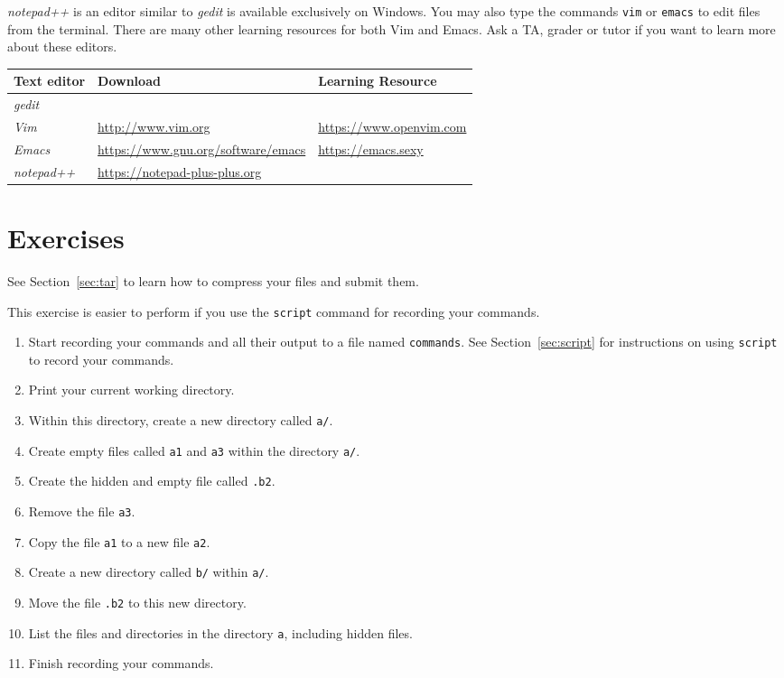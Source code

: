 \documentclass[11pt]{cselabheader}
\begin{document}
\textit{notepad++} is an editor similar to \textit{gedit} is available
exclusively on Windows.  You may also type the commands \texttt{vim} or
\texttt{emacs} to edit files from the terminal.
There are many other learning resources for both Vim and Emacs. Ask a
TA, grader or tutor if you want to learn more about these editors.

\begin{longtabu}[c]{@{}lll@{}}
\toprule
Text editor & Download & Learning Resource\tabularnewline
\midrule
\endhead
\textit{gedit} & & \tabularnewline
\textit{Vim} & \url{http://www.vim.org} & \url{https://www.openvim.com} \tabularnewline
\textit{Emacs} & \url{https://www.gnu.org/software/emacs} & \url{https://emacs.sexy} \tabularnewline
\textit{notepad++} & \url{https://notepad-plus-plus.org} & \tabularnewline
\end{longtabu}

\newpage

\section{Exercises}\label{exercises}
See Section~\ref{sec:tar} to learn how to compress your files and submit them.

\begin{ex}[commands]
  This exercise is easier to perform if you use the \texttt{script}
  command for recording your commands.
  
\begin{enumerate}
\item Start recording your commands and all their output to a file
named \texttt{commands}. See Section~\ref{sec:script} for
instructions on using \texttt{script} to record your commands.
\item Print your current working directory.
\item Within this directory, create a new directory called \texttt{a/}.
\item Create empty files called \texttt{a1} and \texttt{a3} within
the directory \texttt{a/}.
\item Create the hidden and empty file called \texttt{.b2}.
\item Remove the file \texttt{a3}.
\item Copy the file \texttt{a1} to a new file \texttt{a2}.
\item Create a new directory called \texttt{b/} within \texttt{a/}.
\item Move the file \texttt{.b2} to this new directory.
\item List the files and directories in the directory \texttt{a}, including hidden files.
\item Finish recording your commands.
\end{enumerate}
\end{ex}
\end{document}
